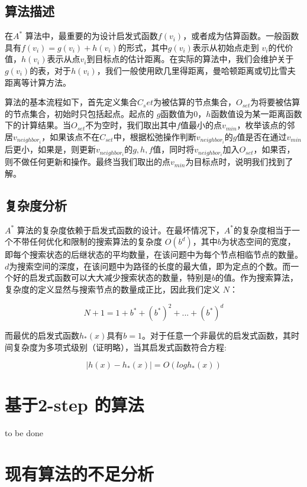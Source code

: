 \documentclass{standalone}
\begin{document}
\subsection{算法描述}
在$A^{*}$ 算法中，最重要的为设计启发式函数$f(v_i)$，或者成为估算函数。一般函数具有$f(v_i) = g(v_i) + h(v_i)$的形式，其中$g(v_i)$表示从初始点走到 $v_i$的代价值，$h(v_i)$表示从点$v_i$到目标点的估计距离。在实际的算法中，我们会维护关于$g(v_i)$的表，对于$h(v_i)$，我们一般使用欧几里得距离，曼哈顿距离或切比雪夫距离等计算方法。\par
算法的基本流程如下，首先定义集合$C_set$为被估算的节点集合，$O_{set}$为将要被估算的节点集合，初始时只包括起点。起点的 $g$函数值为0，$h$函数值设为某一距离函数下的计算结果。当$O_{set}$不为空时，我们取出其中$f$值最小的点$v_{min}$，枚举该点的邻居$v_{neighbor_i}$，如果该点不在$C_{set}$中，根据松弛操作判断$v_{neighbor_i}$的$g$值是否在通过$v_{min}$后更小，如果是，则更新$v_{neighbor_i}$的$g, h, f$值，同时将$v_{neighbor_i}$加入$O_{set}$，如果否，则不做任何更新和操作。最终当我们取出的点$v_{min}$为目标点时，说明我们找到了解。
\subsection{复杂度分析}
$A^{*}$ 算法的复杂度依赖于启发式函数的设计。在最坏情况下，$A^{*}$的复杂度相当于一个不带任何优化和限制的搜索算法的复杂度 $O(b^d)$，其中$b$为状态空间的宽度，即每个搜索状态的后继状态的平均数量，在该问题中为每个节点相临节点的数量。$d$为搜索空间的深度，在该问题中为路径的长度的最大值，即为定点的个数。而一个好的启发式函数可以大大减少搜索状态的数量，特别是$b$的值。作为搜索算法，复杂度的定义显然与搜索节点的数量成正比，因此我们定义 $N$： 
\begin{center}
    \begin{equation}
        N + 1 = 1 + b^* + (b^*)^2 + ... + (b^*)^d
    \end{equation}
\end{center}
而最优的启发式函数$h_*(x)$具有$b=1$。对于任意一个非最优的启发式函数，其时间复杂度为多项式级别（证明略），当其启发式函数符合方程:
\begin{center}
    \begin{equation}
        |h(x) - h_*(x)| = O(logh_*(x))
    \end{equation}
\end{center}
\section{基于2-step 的算法}
to be done
\section{现有算法的不足分析}
\end{document}
